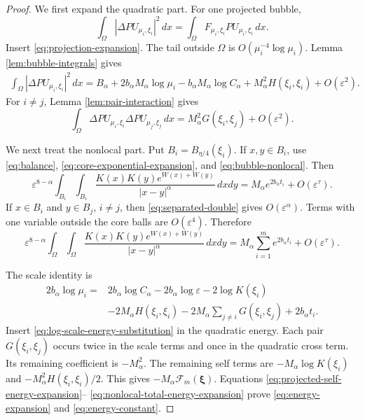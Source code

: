 \documentclass[11pt]{article}
\numberwithin{equation}{section}
\begin{document}
\begin{proof}
We first expand the quadratic part.  For one projected bubble,
\begin{equation*}
\int_\Omega|\Delta PU_{\mu_i,\xi_i}|^2\,dx
=
\int_\Omega F_{\mu_i,\xi_i}PU_{\mu_i,\xi_i}\,dx.
\end{equation*}
Insert \eqref{eq:projection-expansion}.  The tail outside $\Omega$
is $O(\mu_i^{-4}\log\mu_i)$.  Lemma
\ref{lem:bubble-integrals} gives
\begin{equation}\label{eq:projected-self-energy-expansion}
\begin{aligned}
\int_\Omega|\Delta PU_{\mu_i,\xi_i}|^2\,dx
={}B_\alpha+2b_\alpha M_\alpha\log\mu_i
-b_\alpha M_\alpha\log C_\alpha+M_\alpha^2H(\xi_i,\xi_i)+O(\varepsilon^2).
\end{aligned}
\end{equation}
For $i\ne j$, Lemma \ref{lem:pair-interaction} gives
\begin{equation*}
\int_\Omega
\Delta PU_{\mu_i,\xi_i}\Delta PU_{\mu_j,\xi_j}\,dx
=
M_\alpha^2G(\xi_i,\xi_j)+O(\varepsilon^2).
\end{equation*}

We next treat the nonlocal part.  Put
$B_i=B_{\eta/4}(\xi_i)$.  If $x,y\in B_i$, use
\eqref{eq:balance}, \eqref{eq:core-exponential-expansion}, and
\eqref{eq:bubble-nonlocal}.  Then
\begin{equation*}
\varepsilon^{8-\alpha}
\int_{B_i}\int_{B_i}
\frac{K(x)K(y)e^{W(x)+W(y)}}{|x-y|^\alpha}\,dxdy
=
M_\alpha e^{2b_\alpha t_i}+O(\varepsilon^\tau).
\end{equation*}
If $x\in B_i$ and $y\in B_j$, $i\ne j$, then
\eqref{eq:separated-double} gives $O(\varepsilon^\alpha)$.
Terms with one variable outside the core balls are
$O(\varepsilon^4)$.  Therefore
\begin{equation}\label{eq:nonlocal-total-energy-expansion}
\varepsilon^{8-\alpha}
\int_\Omega\int_\Omega
\frac{K(x)K(y)e^{W(x)+W(y)}}{|x-y|^\alpha}\,dxdy
=
M_\alpha\sum_{i=1}^{m}e^{2b_\alpha t_i}
+O(\varepsilon^\tau).
\end{equation}

The scale identity is
\begin{equation}\label{eq:log-scale-energy-substitution}
\begin{aligned}
2b_\alpha\log\mu_i
={}&2b_\alpha\log C_\alpha
-2b_\alpha\log\varepsilon
-2\log K(\xi_i)\\
&-2M_\alpha H(\xi_i,\xi_i)
-2M_\alpha\sum_{j\ne i}G(\xi_i,\xi_j)
+2b_\alpha t_i.
\end{aligned}
\end{equation}
Insert \eqref{eq:log-scale-energy-substitution} in the quadratic
energy.  Each pair $G(\xi_i,\xi_j)$ occurs twice in the scale terms
and once in the quadratic cross term.  Its remaining coefficient is
$-M_\alpha^2$.  The remaining self terms are
$-M_\alpha\log K(\xi_i)$ and
$-M_\alpha^2H(\xi_i,\xi_i)/2$.  This gives
$-M_\alpha\mathcal F_m(\boldsymbol\xi)$.  Equations
\eqref{eq:projected-self-energy-expansion}--
\eqref{eq:nonlocal-total-energy-expansion} prove
\eqref{eq:energy-expansion} and \eqref{eq:energy-constant}.


\end{proof}
\end{document}
